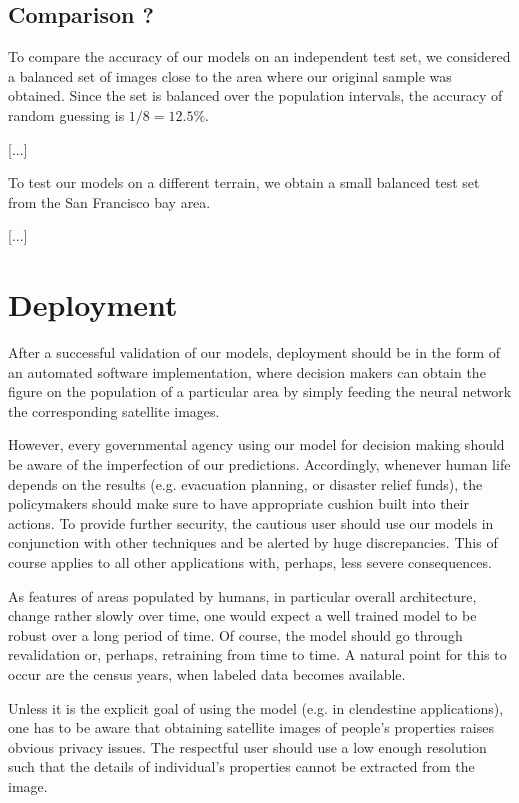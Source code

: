 \documentclass{article}
\begin{document}
\subsection{Comparison ?}
To compare the accuracy of our models on an independent test set, we considered a balanced set of images close to the area where our original sample was obtained. Since the set is balanced over the population intervals, the accuracy of random guessing is $1/8=12.5\%$.

[...]

To test our models on a different terrain, we obtain a small balanced test set from the San Francisco bay area.

[...]

\section{Deployment}
After a successful validation of our models, deployment should be in the form of an automated software implementation, where decision makers can obtain the figure on the population of a particular area by simply feeding the neural network the corresponding satellite images.

However, every governmental agency using our model for decision making should be aware of the imperfection of our predictions. Accordingly, whenever human life depends on the results (e.g. evacuation planning, or disaster relief funds), the policymakers should make sure to have appropriate cushion built into their actions. To provide further security, the cautious user should use our models in conjunction with other techniques and be alerted by huge discrepancies. This of course applies to all other applications with, perhaps, less severe consequences.

As features of areas populated by humans, in particular overall architecture, change rather slowly over time, one would expect a well trained model to be robust over a long period of time. Of course, the model should go through revalidation or, perhaps, retraining from time to time. A natural point for this to occur are the census years, when labeled data becomes available.

Unless it is the explicit goal of using the model (e.g. in clendestine applications), one has to be aware that obtaining satellite images of people's properties raises obvious privacy issues. The respectful user should use a low enough resolution such that the details of individual's properties cannot be extracted from the image.
\end{document}
